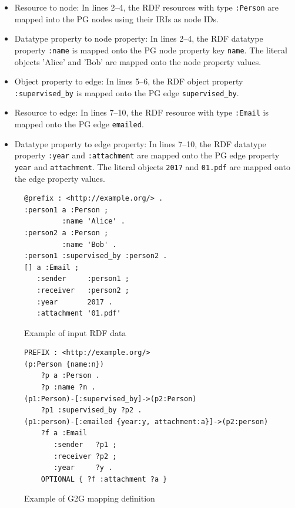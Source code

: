 \documentclass[runningheads]{llncs}
\begin{document}
\begin{itemize}
    \item Resource to node: In lines 2--4, the RDF resources with type \texttt{:Person} are mapped into the PG nodes using their IRIs as node IDs.
    \item Datatype property to node property: In lines 2--4, the RDF datatype property \texttt{:name} is mapped onto the PG node property key \texttt{name}. The literal objects 'Alice' and 'Bob' are mapped onto the node property values.
    \item Object property to edge: In lines 5--6, the RDF object property \texttt{:supervised\_by} is mapped onto the PG edge \texttt{supervised\_by}.
    \item Resource to edge: In lines 7--10, the RDF resource with type \texttt{:Email} is mapped onto the PG edge \texttt{emailed}. 
    \item Datatype property to edge property: In lines 7--10, the RDF datatype property \texttt{:year} and \texttt{:attachment} are mapped onto the PG edge property \texttt{year} and \texttt{attachment}. The literal objects \texttt{2017} and \texttt{01.pdf} are mapped onto the edge property values.
\end{itemize}


\begin{figure}[!t]
\begin{scriptsize}
\begin{verbatim}
@prefix : <http://example.org/> .
:person1 a :Person ;
         :name 'Alice' .
:person2 a :Person ;
         :name 'Bob' .
:person1 :supervised_by :person2 .
[] a :Email ;
   :sender     :person1 ;
   :receiver   :person2 ;
   :year       2017 .
   :attachment '01.pdf'
\end{verbatim}
\end{scriptsize}
\caption{Example of input RDF data}
\label{fig:example-rdf}
\end{figure}


\begin{figure}[!t]
\begin{scriptsize}
\begin{verbatim}
PREFIX : <http://example.org/>
(p:Person {name:n})
    ?p a :Person .
    ?p :name ?n .
(p1:Person)-[:supervised_by]->(p2:Person)
    ?p1 :supervised_by ?p2 .
(p1:person)-[:emailed {year:y, attachment:a}]->(p2:person)
    ?f a :Email
       :sender   ?p1 ;
       :receiver ?p2 ;
       :year     ?y .
    OPTIONAL { ?f :attachment ?a }
\end{verbatim}
\end{scriptsize}
\caption{Example of G2G mapping definition}
\label{fig:example-g2g}
\end{figure}
\end{document}
